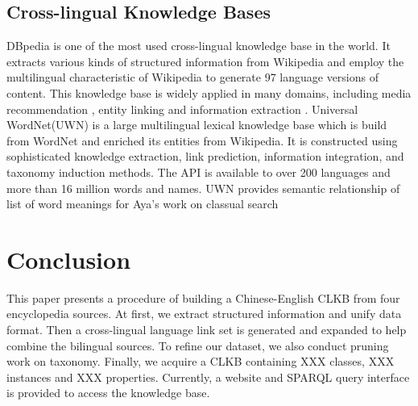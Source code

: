 \documentclass[runningheads,a4paper]{llncs}
\begin{document}
\begin{CJK*}{UTF8}{song}
\subsection{Cross-lingual Knowledge Bases}
DBpedia \cite{auer2007dbpedia,mendes2012dbpedia} is one of the most used cross-lingual knowledge base in the world. It extracts various kinds of structured information from Wikipedia and employ the multilingual characteristic of Wikipedia to generate 97 language versions of content. This knowledge base is widely applied in many domains, including media recommendation \cite{fernandez2011generic,kaminskas2012knowledge}, entity linking\cite{mendes2011evaluating} and information extraction \cite{dutta2013integrating}. Universal WordNet(UWN)\cite{de2012uwn} is a large multilingual lexical knowledge base which is build from WordNet and enriched its entities from Wikipedia. It is constructed using sophisticated knowledge extraction, link prediction, information integration, and taxonomy induction methods. The API is available to over 200 languages and more than 16 million words and names. UWN provides semantic relationship of list of word meanings for Aya's work on classual search \cite{al2015classual}


\section{Conclusion}
\label{sec:con}
This paper presents a procedure of building a Chinese-English CLKB from four encyclopedia sources. At first, we extract structured information and unify data format. Then a cross-lingual language link set is generated and expanded to help combine the bilingual sources. To refine our dataset, we also conduct pruning work on taxonomy. Finally, we acquire a CLKB containing XXX classes, XXX instances and XXX properties. Currently, a website and SPARQL query interface is provided to access the knowledge base.


\end{CJK*}
\end{document}
